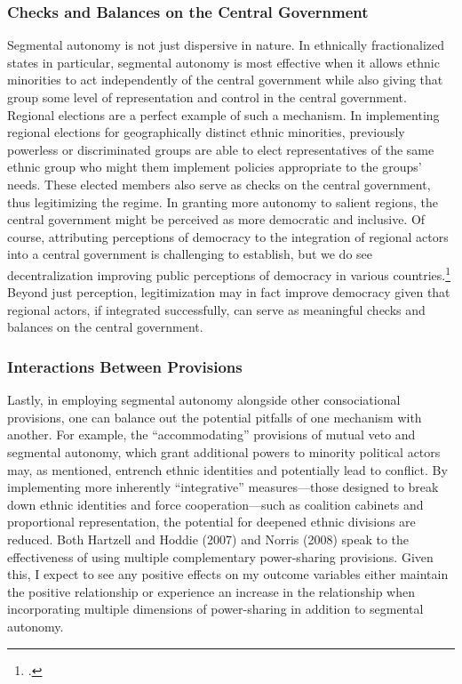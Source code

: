 \documentclass[12pt]{article}
\begin{document}
\subsubsection{Checks and Balances on the Central Government}
Segmental autonomy is not just dispersive in nature. In ethnically fractionalized states in particular, segmental autonomy is most effective when it allows ethnic minorities to act independently of the central government while also giving that group some level of representation and control in the central government. Regional elections are a perfect example of such a mechanism. In implementing regional elections for geographically distinct ethnic minorities, previously powerless or discriminated groups are able to elect representatives of the same ethnic group who might them implement policies appropriate to the groups' needs. These elected members also serve as checks on the central government, thus legitimizing the regime. In granting more autonomy to salient regions, the central government might be perceived as more democratic and inclusive. Of course, attributing perceptions of democracy to the integration of regional actors into a central government is challenging to establish, but we do see decentralization improving public perceptions of democracy in various countries.\footcite{escobarlemmon_does_2014, world_values_survey_world_2007} Beyond just perception, legitimization may in fact improve democracy given that regional actors, if integrated successfully, can serve as meaningful checks and balances on the central government.

\subsubsection{Interactions Between Provisions}
Lastly, in employing segmental autonomy alongside other consociational provisions, one can balance out the potential pitfalls of one mechanism with another. For example, the ``accommodating'' provisions of mutual veto and segmental autonomy, which grant additional powers to minority political actors may, as mentioned, entrench ethnic identities and potentially lead to conflict. By implementing more inherently ``integrative'' measures---those designed to break down ethnic identities and force cooperation---such as coalition cabinets and proportional representation, the potential for deepened ethnic divisions are reduced. Both Hartzell and Hoddie (2007) and Norris (2008) speak to the effectiveness of using multiple complementary power-sharing provisions. Given this, I expect to see any positive effects on my outcome variables either maintain the positive relationship or experience an increase in the relationship when incorporating multiple dimensions of power-sharing in addition to segmental autonomy.
\end{document}
